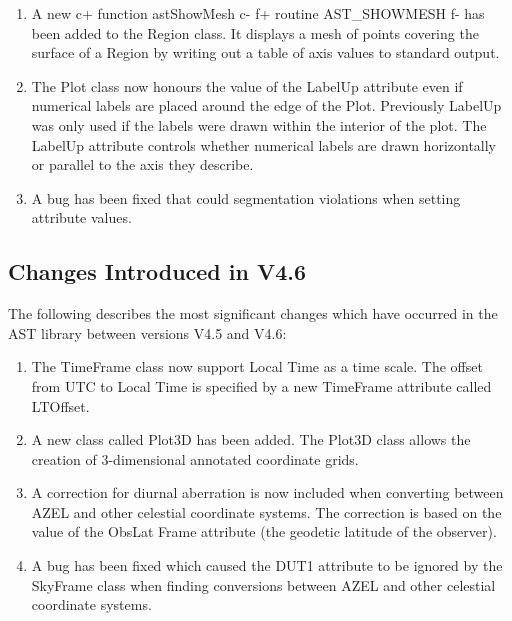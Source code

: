 \documentclass[twoside,11pt]{article}
\begin{document}
\begin{enumerate}
\item A new 
c+
function astShowMesh 
c-
f+
routine AST\_SHOWMESH
f-
has been added to the Region class. It displays a mesh of points covering
the surface of a Region by writing out a table of axis values to standard
output.

\item The Plot class now honours the value of the LabelUp attribute even if
numerical labels are placed around the edge of the Plot. Previously
LabelUp was only used if the labels were drawn within the interior of 
the plot. The LabelUp attribute controls whether numerical labels are 
drawn horizontally or parallel to the axis they describe.

\item A bug has been fixed that could segmentation violations when setting 
attribute values.

\end{enumerate}

\subsection{Changes Introduced in V4.6}

The following describes the most significant changes which have
occurred in the AST library between versions V4.5 and V4.6:

\begin{enumerate}

\item The TimeFrame class now support Local Time as a time scale. The offset
from UTC to Local Time is specified by a new TimeFrame attribute called 
LTOffset.

\item A new class called Plot3D has been added. The Plot3D class allows
the creation of 3-dimensional annotated coordinate grids.

\item A correction for diurnal aberration is now included when
converting between AZEL and other celestial coordinate systems. The
correction is based on the value of the ObsLat Frame attribute (the
geodetic latitude of the observer).

\item A bug has been fixed which caused the DUT1 attribute to be ignored
by the SkyFrame class when finding conversions between AZEL and other
celestial coordinate systems.

\end{enumerate}
\end{document}

